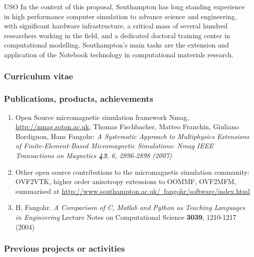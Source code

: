 \begin{sitedescription}{USO}
\medskip In the context of this proposal, Southampton has long
standing experience in high performance computer simulation to advance
science and engineering, with significant hardware infrastructure, a
critical mass of several hundred researchers working in the field, and
a dedicated doctoral training center in computational modelling.
Southampton's main tasks are the extension and application of the
\Jupyter{} Notebook technology in computational materials research.

\subsubsection*{Curriculum vitae}





%

\subsubsection*{Publications, products, achievements}

\begin{enumerate}
\item Open Source micromagnetic simulation framework Nmag,
  \href{http://nmag.soton.ac.uk}{http://nmag.soton.ac.uk}, Thomas
  Fischbacher, Matteo Franchin, Giuliano Bordignon, Hans Fangohr: \emph{
A Systematic Approach to Multiphysics Extensions of Finite-Element-Based Micromagnetic Simulations: Nmag 
IEEE Transactions on Magnetics \textbf{43}, 6, 2896-2898 (2007)}
\item Other open source contributions to the micromagnetic simulation
  community: OVF2VTK, higher order anisotropy extensions to OOMMF,
  OVF2MFM, summarised at
  \href{http://www.southampton.ac.uk/~fangohr/software/index.html}{http://www.southampton.ac.uk/~fangohr/software/index.html} 
\item H. Fangohr.
\emph{A Comparison of C, Matlab and Python as Teaching Languages in Engineering}
Lecture Notes on Computational Science \textbf{3039}, 1210-1217 (2004)
\end{enumerate}

\subsubsection*{Previous projects or activities}


\end{sitedescription}
